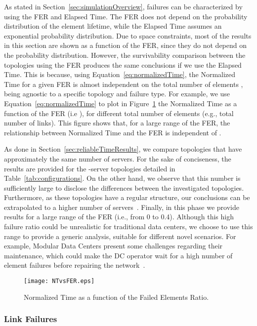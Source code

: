 As stated in Section~\ref{sec:simulationOverview}, failures can be characterized by using the FER and Elapsed Time. The FER does not depend on the probability distribution of the element lifetime, while the Elapsed Time assumes an exponential probability distribution. Due to space constraints, most of the results in this section are shown as a function of the FER, since they do not depend on the probability distribution. However, the survivability comparison between the topologies using the FER produces the same conclusions if we use the Elapsed Time. This is because, using Equation~\ref{eq:normalizedTime}, the Normalized Time for a given FER is almost independent on the total number of elements , being agnostic to a specific topology and failure type.
For example, we use Equation~\ref{eq:normalizedTime} to plot in Figure~\ref{fig:FER_elapsedTime} the Normalized Time as a function of the FER (i.e ), for different total number of elements  (e.g., total number of links). This figure shows that, for a large range of the FER, the relationship between Normalized Time and the FER is independent of .

As done in Section~\ref{sec:reliableTimeResults}, we compare topologies that have approximately the same number of servers. For the sake of conciseness, the results are provided for the -server topologies detailed in Table~\ref{tab:configurations}. On the other hand, we observe that this number is sufficiently large to disclose the differences between the investigated topologies. Furthermore, as these topologies have a regular structure, our conclusions can be extrapolated to a higher number of servers~\cite{bilal2013Characterization}.
Finally, in this phase we provide results for a large range of the FER (i.e., from 0 to 0.4). Although this high failure ratio could be unrealistic for traditional data centers, we choose to use this range 
to provide a generic analysis, suitable for different novel scenarios. For example, Modular Data Centers present some challenges regarding their maintenance, which could make the DC operator wait for a high number of element failures before repairing the network~\cite{guo2009bcube}.
\begin{figure}
\centering
\texttt{[image: NTvsFER.eps]}
\caption{Normalized Time as a function of the Failed Elements Ratio.}
\label{fig:FER_elapsedTime}
\end{figure}
\subsubsection{Link Failures}
\label{sec:perfEvaluationLinkSurvival}

